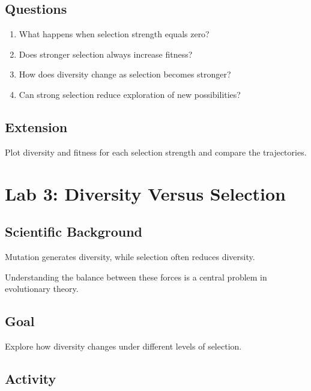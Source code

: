 \documentclass[
  oneside,
  openany]{book}
\providecommand{\tightlist}{%
  \setlength{\itemsep}{0pt}\setlength{\parskip}{0pt}}
\begin{document}
\subsection{Questions}\label{questions-1}

\begin{enumerate}
\def\labelenumi{\arabic{enumi}.}
\tightlist
\item
  What happens when selection strength equals zero?
\item
  Does stronger selection always increase fitness?
\item
  How does diversity change as selection becomes stronger?
\item
  Can strong selection reduce exploration of new possibilities?
\end{enumerate}

\subsection{Extension}\label{extension-1}

Plot diversity and fitness for each selection strength and compare the trajectories.

\section{Lab 3: Diversity Versus Selection}\label{lab-3-diversity-versus-selection}

\subsection{Scientific Background}\label{scientific-background-2}

Mutation generates diversity, while selection often reduces diversity.

Understanding the balance between these forces is a central problem in evolutionary theory.

\subsection{Goal}\label{goal-2}

Explore how diversity changes under different levels of selection.

\subsection{Activity}\label{activity-2}
\end{document}
